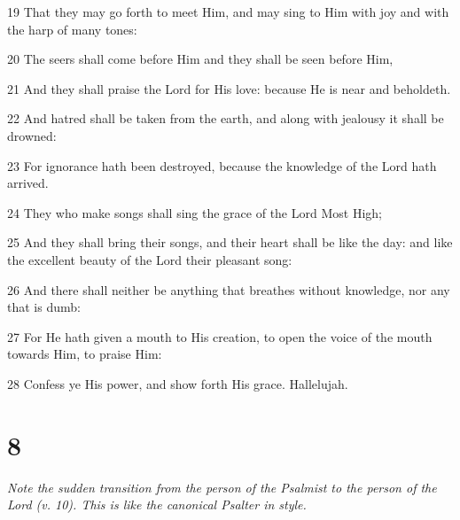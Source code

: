 \par 19 That they may go forth to meet Him, and may sing to Him with joy and with the harp of many tones:
\par 20 The seers shall come before Him and they shall be seen before Him,
\par 21 And they shall praise the Lord for His love: because He is near and beholdeth.
\par 22 And hatred shall be taken from the earth, and along with jealousy it shall be drowned:
\par 23 For ignorance hath been destroyed, because the knowledge of the Lord hath arrived.
\par 24 They who make songs shall sing the grace of the Lord Most High;
\par 25 And they shall bring their songs, and their heart shall be like the day: and like the excellent beauty of the Lord their pleasant song:
\par 26 And there shall neither be anything that breathes without knowledge, nor any that is dumb:
\par 27 For He hath given a mouth to His creation, to open the voice of the mouth towards Him, to praise Him:
\par 28 Confess ye His power, and show forth His grace. Hallelujah.

\chapter{8}

\par \textit{Note the sudden transition from the person of the Psalmist to the person of the Lord (v. 10). This is like the canonical Psalter in style.}

